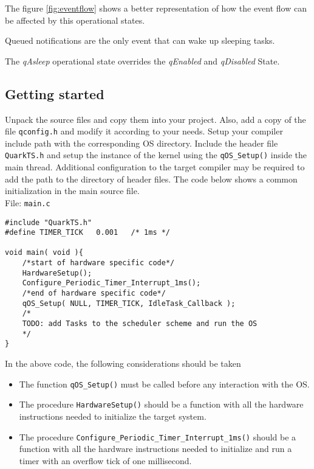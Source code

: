 The figure \ref{fig:eventflow} shows a better representation of how the event flow can be affected by this operational states.

\begin{tcolorbox}
\HandRight Queued notifications are the only event that can wake up sleeping tasks.
\end{tcolorbox}
\begin{tcolorbox}
\HandRight The \textit{qAsleep} operational state overrides the \textit{qEnabled} and \textit{qDisabled} State.
\end{tcolorbox}




\subsection{Getting started}
Unpack the source files and copy them into your project. Also, add a copy of the file \lstinline{qconfig.h} and modify it according to your needs. Setup your compiler include path with the corresponding OS directory. Include the header file \lstinline{QuarkTS.h} and setup the instance of the kernel using the \lstinline{qOS_Setup()} inside the main thread. Additional configuration to the target compiler may be required to add the path to the directory of header files. The code below shows a common initialization in the main source file. \\

File: \lstinline{main.c}
\begin{lstlisting}[style=CStyle]
#include "QuarkTS.h"
#define TIMER_TICK   0.001   /* 1ms */ 

void main( void ){
    /*start of hardware specific code*/
    HardwareSetup();  
    Configure_Periodic_Timer_Interrupt_1ms(); 
    /*end of hardware specific code*/
    qOS_Setup( NULL, TIMER_TICK, IdleTask_Callback ); 
    /*
    TODO: add Tasks to the scheduler scheme and run the OS
    */
}
\end{lstlisting}

In the above code, the following considerations should be taken
\begin{itemize}
    \item The function \lstinline{qOS_Setup()} must be called before any interaction with the OS.
    \item The procedure \lstinline{HardwareSetup()} should be a function with all the hardware instructions needed to initialize the target system.
    \item  The procedure \lstinline{Configure_Periodic_Timer_Interrupt_1ms()} should be a function with all the hardware instructions needed to initialize and run a timer with an overflow tick of one millisecond.
\end{itemize}

